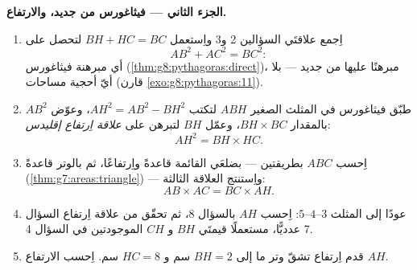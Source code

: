 \begin{problem}[{مسألة نهاية الأسبوع --- اِرتفاع المثلث القائم
الزاوية: $AB^2 = BH \times BC$ و $AH^2 = BH \times HC$، وبرهان ثانٍ
لفيثاغورس، وآلة لإنشاء الجذور التربيعية}]
\medskip
\noindent\textbf{الجزء الثاني --- فيثاغورس من جديد، والارتفاع.}
\begin{enumerate}[resume]
  \item اِجمع علاقتَي السؤالين 2 و3 واِستعمل
        $BH + HC = BC$ لتحصل على
        \[
        AB^2 + AC^2 = BC^2 :
        \]
        أي مبرهنة فيثاغورس (\cref{thm:g8:pythagoras:direct})،
        مبرهنًا عليها من جديد --- بلا أيّ أحجية مساحات (قارن
        \cref{exo:g8:pythagoras:11}).
  \item طبّق فيثاغورس في المثلث الصغير $ABH$ لتكتب
        $AH^2 = AB^2 - BH^2$، وعوّض $AB^2$ بالمقدار
        $BH \times BC$، وعمّل $BH$ لتبرهن على
        \emph{علاقة اِرتفاع إقليدس}:
        \[
        AH^2 = BH \times HC .
        \]
  \item اِحسب  $ABC$ بطريقتين --- بضلعَي القائمة قاعدةً
        واِرتفاعًا، ثم بالوتر قاعدةً
        (\cref{thm:g7:areas:triangle}) --- واِستنتج العلاقة
        الثالثة:
        \[
        AB \times AC = BC \times AH .
        \]
  \item عودًا إلى المثلث $3$--$4$--$5$: اِحسب $AH$
        بالسؤال 8، ثم تحقّق من علاقة اِرتفاع السؤال
        7 عدديًّا، مستعملًا قيمتَي $BH$ و $CH$ الموجودتين في
        السؤال 4.
  \item قدم اِرتفاع تشقّ وتر  ما
        إلى  $BH = 2$ سم و $HC = 8$ سم.
        اِحسب الارتفاع $AH$.
\end{enumerate}


\end{problem}
